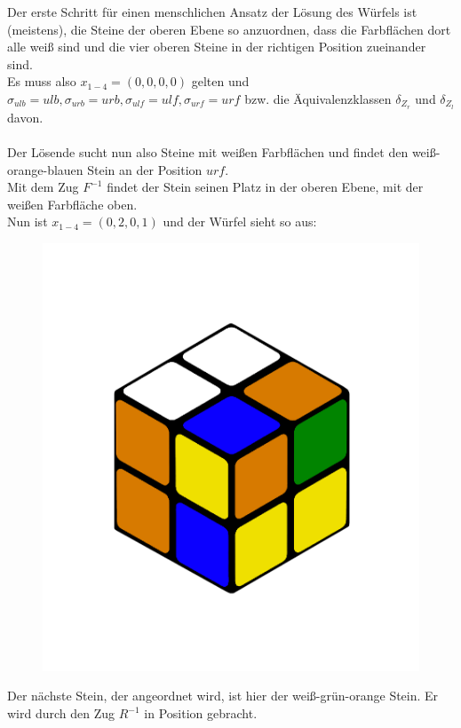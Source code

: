 \documentclass[12pt,a4paper, usenames, dvipsnames]{article}
\begin{document}
Der erste Schritt für einen menschlichen Ansatz der Lösung des Würfels ist (meistens), die Steine der oberen Ebene so anzuordnen, dass die Farbflächen dort alle weiß sind und die vier oberen Steine in der richtigen Position zueinander sind. \\
Es muss also $x_{1-4} = (0,0,0,0)$ gelten und $\sigma_{ulb}=ulb, \sigma_{urb} = urb, \sigma_{ulf} = ulf, \sigma_{urf}=urf$ bzw. die Äquivalenzklassen $\delta_{Z_r}$ und $\delta_{Z_l}$ davon. \\
\\
Der Lösende sucht nun also Steine mit weißen Farbflächen und findet den weiß-orange-blauen Stein an der Position $urf$. \\
Mit dem Zug $F^{-1}$ findet der Stein seinen Platz in der oberen Ebene, mit der weißen Farbfläche oben. \\
Nun ist $x_{1-4}=(0,2,0,1)$ und der Würfel sieht so aus:
\begin{figure}[H]
\centering
\includegraphics[scale=0.12]{0201.png}
\caption[Lösung von Mensch: Schritt 1]{}
\end{figure}
Der nächste Stein, der angeordnet wird, ist hier der weiß-grün-orange Stein. Er wird durch den Zug $R^{-1}$ in Position gebracht.
\end{document}
